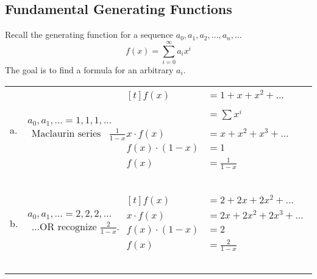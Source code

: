 \subsection{Fundamental Generating Functions}
Recall the generating function for a sequence $a_0, a_1, a_2, \dots, a_n, \dots$
\[
f(x) = \sum_{i=0}^{\infty} a_i x^i
\]
The goal is to find a formula for an arbitrary $a_i$. \\
\begin{longtable}{p{0.2in}p{2.2in}p{3.6in}}
    a.  &   $a_0, a_1, \dots = 1, 1, 1, \dots$ \begin{multline*} \text{Maclaurin series for $\frac{1}{1-x}.$} \end{multline*} &
        $\begin{aligned}[t]
            f(x)    &=  1 + x + x^2 + \dots \\ \\
            &= \sum x^i \\ \\
            x \cdot f(x)  &=  x + x^2 + x^3 + \dots \\
            f(x) \cdot (1-x) &= 1 \\
            f(x)    &=  \frac{1}{1-x}
        \end{aligned}$ \\~\\
    b.  &   $a_0, a_1, \dots = 2, 2, 2, \dots$ \begin{multline*} \text{...OR recognize $\frac{2}{1-x}$.}\end{multline*}&
        $\begin{aligned}[t]
            f(x)    &=  2 + 2x + 2x^2 + \dots \\
            x \cdot f(x)  &=  2x + 2x^2 + 2x^3 + \dots \\
            f(x) \cdot (1-x) &= 2 \\
            f(x)    &=  \frac{2}{1-x}
        \end{aligned}$ \\~\\
        

\end{longtable}

